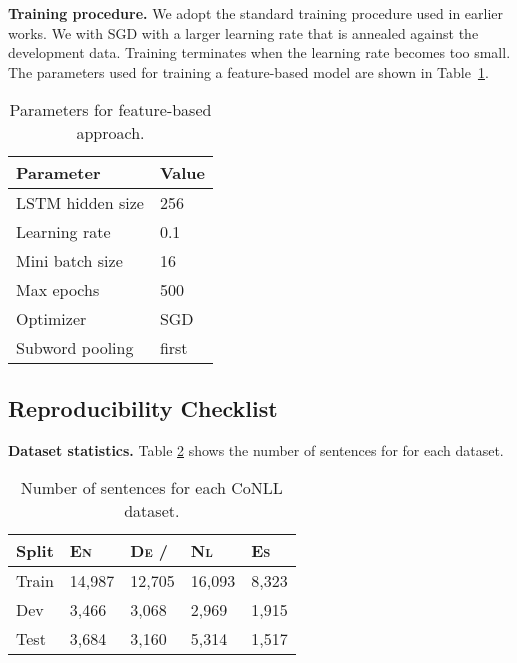 \documentclass[11pt,a4paper]{article}
\begin{document}
\noindent 
\textbf{Training procedure.} We adopt the standard training procedure used in earlier works. We with SGD with a larger learning rate that is annealed against the development data. Training terminates when the learning rate becomes too small. 
The parameters used for training a feature-based model are shown in Table~\ref{ner-training-parameters-feature-based}. 








\begin{table}[h!]
\begin{center}
\begin{tabular}{ l l }
\toprule
Parameter & Value \\
\midrule
LSTM hidden size & 256 \\
Learning rate & 0.1 \\
Mini batch size & 16 \\
Max epochs & 500 \\
Optimizer & SGD \\
Subword pooling & first \\
\bottomrule
\end{tabular}
\end{center}
\caption{\label{ner-training-parameters-feature-based} Parameters for feature-based approach.}
\end{table}

\subsection{Reproducibility Checklist}

\noindent 
\textbf{Dataset statistics.} Table \ref{tab:dataset_stats} shows the number of sentences for for each dataset.

\begin{table}[h!]
\centering
\begin{tabular}{lllll}
\hline
 Split       &  \textsc{En} & \textsc{De} /  & \textsc{Nl} & \textsc{Es} \\ \hline
 Train       & 14,987       & 12,705                           & 16,093      & 8,323 \\
 Dev         & 3,466        & 3,068                            & 2,969       & 1,915 \\
 Test        & 3,684        & 3,160                            & 5,314       & 1,517 \\
 \hline
\end{tabular}\caption{Number of sentences for each CoNLL dataset.}
\label{tab:dataset_stats}
\end{table}
\end{document}
